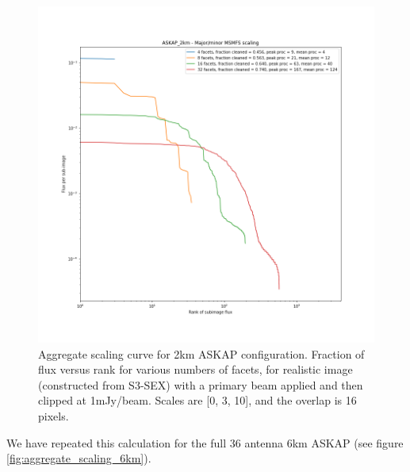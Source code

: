 \documentclass[11pt,a4paper,variablewidth]{article}
\begin{document}
\begin{figure}[H]
  \centering
  \includegraphics[width=\textwidth]{./aggregate_scaling_ASKAP_2km.png}
  \caption{Aggregate scaling curve for 2km ASKAP configuration. Fraction of flux versus rank for various numbers of facets, for realistic image (constructed from S3-SEX) with a primary beam applied and then clipped at 1mJy/beam. Scales are [0, 3, 10], and the overlap is 16 pixels.}
  \label{fig:aggregate_scaling_2km}
\end{figure}

We have repeated this calculation for the full 36 antenna 6km ASKAP (see figure \ref{fig:aggregate_scaling_6km}).
\end{document}
